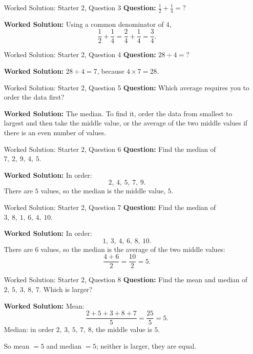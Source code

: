 \documentclass{beamer}
\begin{document}
\begin{frame}{Worked Solution: Starter 2, Question 3}
\small
\textbf{Question:} \(\frac12+\frac14=\mathord{?}\)

\smallskip
\textbf{Worked Solution:} Using a common denominator of \(4\),
\[
\frac12+\frac14=\frac24+\frac14=\frac34.
\]
\end{frame}

\begin{frame}{Worked Solution: Starter 2, Question 4}
\small
\textbf{Question:} \(28 \div 4=\mathord{?}\)

\smallskip
\textbf{Worked Solution:} \(28 \div 4 = 7\), because \(4 \times 7 = 28\).
\end{frame}

\begin{frame}{Worked Solution: Starter 2, Question 5}
\small
\textbf{Question:} Which average requires you to order the data first?

\smallskip
\textbf{Worked Solution:} The median. To find it, order the data from smallest to largest and then take the middle value, or the average of the two middle values if there is an even number of values.
\end{frame}

\begin{frame}{Worked Solution: Starter 2, Question 6}
\small
\textbf{Question:} Find the median of \(7,\ 2,\ 9,\ 4,\ 5\).

\smallskip
\textbf{Worked Solution:} In order:
\[
2,\ 4,\ 5,\ 7,\ 9.
\]
There are \(5\) values, so the median is the middle value, \(5\).
\end{frame}

\begin{frame}{Worked Solution: Starter 2, Question 7}
\small
\textbf{Question:} Find the median of \(3,\ 8,\ 1,\ 6,\ 4,\ 10\).

\smallskip
\textbf{Worked Solution:} In order:
\[
1,\ 3,\ 4,\ 6,\ 8,\ 10.
\]
There are \(6\) values, so the median is the average of the two middle values:
\[
\frac{4+6}{2}=\frac{10}{2}=5.
\]
\end{frame}

\begin{frame}{Worked Solution: Starter 2, Question 8}
\small
\textbf{Question:} Find the mean and median of \(2,\ 5,\ 3,\ 8,\ 7\). Which is larger?

\smallskip
\textbf{Worked Solution:} Mean:
\[
\frac{2+5+3+8+7}{5}=\frac{25}{5}=5.
\]
Median: in order \(2,\ 3,\ 5,\ 7,\ 8\), the middle value is \(5\).

So mean \(=5\) and median \(=5\); neither is larger, they are equal.
\end{frame}
\end{document}

